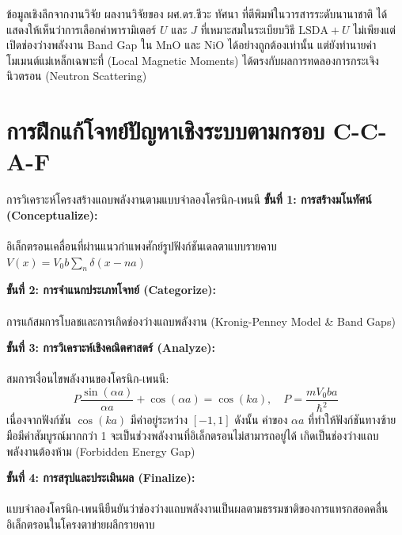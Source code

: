\begin{researchbox}{ข้อมูลเชิงลึกจากงานวิจัย}
ผลงานวิจัยของ ผศ.ดร.ชีวะ ทัศนา ที่ตีพิมพ์ในวารสารระดับนานาชาติ ได้แสดงให้เห็นว่าการเลือกค่าพารามิเตอร์ $U$ และ $J$ ที่เหมาะสมในระเบียบวิธี $\text{LSDA}+U$ ไม่เพียงแต่เปิดช่องว่างพลังงาน Band Gap ใน $\text{MnO}$ และ $\text{NiO}$ ได้อย่างถูกต้องเท่านั้น แต่ยังทำนายค่าโมเมนต์แม่เหล็กเฉพาะที่ (Local Magnetic Moments) ได้ตรงกับผลการทดลองการกระเจิงนิวตรอน (Neutron Scattering)
\end{researchbox}

\section{การฝึกแก้โจทย์ปัญหาเชิงระบบตามกรอบ C-C-A-F}

\begin{ccafsolution}{การวิเคราะห์โครงสร้างแถบพลังงานตามแบบจำลองโครนิก-เพนนี}
\textbf{ขั้นที่ 1: การสร้างมโนทัศน์ (Conceptualize):}\\\\ อิเล็กตรอนเคลื่อนที่ผ่านแนวกำแพงศักย์รูปฟังก์ชันเดลตาแบบรายคาบ $V(x) = V_0 b \sum_n \delta(x - na)$

\vspace{4pt}
\textbf{ขั้นที่ 2: การจำแนกประเภทโจทย์ (Categorize):}\\\\ การแก้สมการโบลชและการเกิดช่องว่างแถบพลังงาน (Kronig-Penney Model \& Band Gaps)

\vspace{4pt}
\textbf{ขั้นที่ 3: การวิเคราะห์เชิงคณิตศาสตร์ (Analyze):}\\\\ สมการเงื่อนไขพลังงานของโครนิก-เพนนี:
\begin{equation}
P \frac{\sin(\alpha a)}{\alpha a} + \cos(\alpha a) = \cos(ka), \quad P = \frac{m V_0 b a}{\hbar^2}
\end{equation}
เนื่องจากฟังก์ชัน $\cos(ka)$ มีค่าอยู่ระหว่าง $[-1, 1]$ ดังนั้น ค่าของ $\alpha a$ ที่ทำให้ฟังก์ชันทางซ้ายมือมีค่าสัมบูรณ์มากกว่า 1 จะเป็นช่วงพลังงานที่อิเล็กตรอนไม่สามารถอยู่ได้ เกิดเป็นช่องว่างแถบพลังงานต้องห้าม (Forbidden Energy Gap)

\vspace{4pt}
\textbf{ขั้นที่ 4: การสรุปและประเมินผล (Finalize):}\\\\ แบบจำลองโครนิก-เพนนียืนยันว่าช่องว่างแถบพลังงานเป็นผลตามธรรมชาติของการแทรกสอดคลื่นอิเล็กตรอนในโครงตาข่ายผลึกรายคาบ
\end{ccafsolution}

